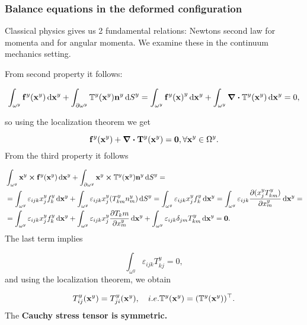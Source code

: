 \documentclass[reqno, a4paper]{article}
\begin{document}
\subsubsection{Balance equations in the deformed configuration}
\label{sec:balance_equations_cauchy}
Classical physics gives us 2 fundamental relations: Newtons second law for momenta and for angular momenta. We examine these in the continuum mechanics setting.

From second property it follows:

\begin{equation}
	\int_{\omega^y} \vb{f}^y(\vb{x}^y) \dd{\vb{x}^y} + \int_{\partial \omega^y} \tensorq{T}^y(\vb{x}^y) \vb{n}^y \dd{S}^y  =\int_{\omega^{y}}\vb{f}^{y}\qty(\vb{x})^{y}\dd{\vb{x}^{y}}+ \int_{\omega^y} \divergence{\tensorq{T}^y}(\vb{x}^{y}) \dd{\vb{x}^{y}} = 0,
\end{equation}

so using the localization theorem we get

\begin{equation*}
	\label{eqn:balanceofforces}
	\vb{f}^y(\vb{x}^y) + \divergence{\vb{T}^y}(\vb{x}^y) = \vb{0}, \forall \vb{x}^y \in \Omega^y.
\end{equation*}
From the third property it follows

\begin{align*}
&	\int_{\omega^y} \vb{x}^y \cross \vb{f}^y(\vb{x}^y) \dd{\vb{x}^y} + \int_{\partial \omega^y} \vb{x}^y \cross \mathbb{T}^y(\vb{x}^y) \vb{n}^{y} \dd{S}^y = \\ &= \int_{\omega^y} \varepsilon_{ijk} x^y_j f^y_k \dd{\vb{x}^y} + \int_{\omega^y}\varepsilon_{ijk}x^y_j (T^y_{km} n^y_m) \dd{S}^y = \int_{\omega^y} \varepsilon_{ijk} x^y_j f^y_k \dd{\vb{x}^y}=\int_{\omega^y} \varepsilon_{ijk} \pdv{(x^y_j T^y_{km})}{x^y_m}\dd{\vb{x}^y} = \\& = \int_{\omega^y}\varepsilon_{ijk}x^y_j f^y_k \dd{\vb{x}^y} + \int_{\omega^y}\varepsilon_{ijk}x^y_j \pdv{T_km}{x^y_m}\dd{\vb{x}^y} + \int_{\omega^y}\varepsilon_{ijk}\delta_{jm}T^y_{km} \dd{\vb{x}^y} = \vb{0}.
\end{align*}
The last term implies

\begin{equation*}
	\int_{\omega^y} \varepsilon_{ijk}T^y_{kj} = 0,
\end{equation*}
and using the localization theorem, we obtain

\begin{equation}
	T^y_{ij} (\vb{x}^y) = T^y_{ji}(\vb{x}^y), \quad{i.e.} \mathbb{T}^y(\vb{x}^y) = (\mathbb{T}^y(\vb{x}^y))^\top.
\end{equation}
The \textbf{Cauchy stress tensor is symmetric.}
\end{document}
